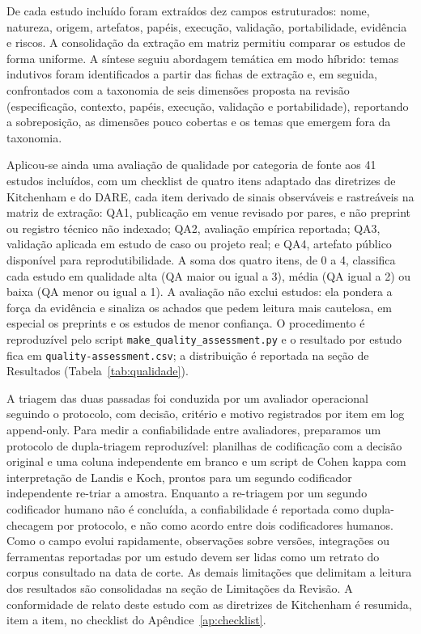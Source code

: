 De cada estudo incluído foram extraídos dez campos estruturados: nome, natureza, origem, artefatos, papéis, execução, validação, portabilidade, evidência e riscos. A consolidação da extração em matriz permitiu comparar os estudos de forma uniforme. A síntese seguiu abordagem temática em modo híbrido: temas indutivos foram identificados a partir das fichas de extração e, em seguida, confrontados com a taxonomia de seis dimensões proposta na revisão (especificação, contexto, papéis, execução, validação e portabilidade), reportando a sobreposição, as dimensões pouco cobertas e os temas que emergem fora da taxonomia.

Aplicou-se ainda uma avaliação de qualidade por categoria de fonte aos 41 estudos incluídos, com um checklist de quatro itens adaptado das diretrizes de Kitchenham e do DARE, cada item derivado de sinais observáveis e rastreáveis na matriz de extração: QA1, publicação em venue revisado por pares, e não preprint ou registro técnico não indexado; QA2, avaliação empírica reportada; QA3, validação aplicada em estudo de caso ou projeto real; e QA4, artefato público disponível para reprodutibilidade. A soma dos quatro itens, de 0 a 4, classifica cada estudo em qualidade alta (QA maior ou igual a 3), média (QA igual a 2) ou baixa (QA menor ou igual a 1). A avaliação não exclui estudos: ela pondera a força da evidência e sinaliza os achados que pedem leitura mais cautelosa, em especial os preprints e os estudos de menor confiança. O procedimento é reproduzível pelo script \texttt{make\_quality\_assessment.py} e o resultado por estudo fica em \texttt{quality-assessment.csv}; a distribuição é reportada na seção de Resultados (Tabela~\ref{tab:qualidade}).

A triagem das duas passadas foi conduzida por um avaliador operacional seguindo o protocolo, com decisão, critério e motivo registrados por item em log append-only. Para medir a confiabilidade entre avaliadores, preparamos um protocolo de dupla-triagem reproduzível: planilhas de codificação com a decisão original e uma coluna independente em branco e um script de Cohen kappa com interpretação de Landis e Koch, prontos para um segundo codificador independente re-triar a amostra. Enquanto a re-triagem por um segundo codificador humano não é concluída, a confiabilidade é reportada como dupla-checagem por protocolo, e não como acordo entre dois codificadores humanos. Como o campo evolui rapidamente, observações sobre versões, integrações ou ferramentas reportadas por um estudo devem ser lidas como um retrato do corpus consultado na data de corte. As demais limitações que delimitam a leitura dos resultados são consolidadas na seção de Limitações da Revisão. A conformidade de relato deste estudo com as diretrizes de Kitchenham é resumida, item a item, no checklist do Apêndice~\ref{ap:checklist}.
